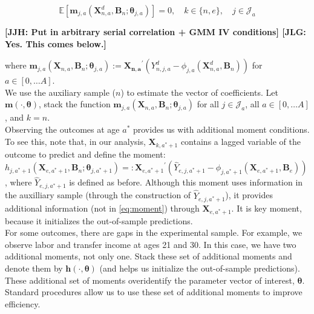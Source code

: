 \begin{equation}
\mathbb{E} \left[ \bm{m}_{j,a} \left( \bm{X}_{n,a}^d, \bm{B}_{n}; \bm{\theta}_{j,a} \right) \right] = 0,  \quad k \in \{n,e\}, \quad j \in \mathcal{J}_a \label{eq:moment}
\end{equation}

\noindent \textbf{[JJH: Put in arbitrary serial correlation + GMM IV conditions] [JLG: Yes. This comes below.]}

\noindent where $\bm{m}_{j,a} \left( \bm{X}_{n,a}, \bm{B}_{n} ; \bm{\theta}_{j,a} \right) := {\bm{X_{n,a}}}^{'} \left( Y_{n,j,a}^d -   \phi_{j,a} \left( \bm{X}_{n,a}^d, \bm{B}_{n} \right) \right)$ for $a \in [0, \ldots A]$.\\

\noindent We use the auxiliary sample ($n$) to estimate the vector of coefficients. Let $\bm{m} \left ( \cdot, \bm{\theta} \right)$, stack the function $\bm{m}_{j,a} \left( \bm{X}_{n,a}, \bm{B}_{n} ; \bm{\theta}_{j,a} \right)$  for all $j \in \mathcal{J}_a$, all $a \in [0, \ldots A]$, and $k = n$.\\

\noindent Observing the outcomes at age $a^*$ provides us with additional moment conditions. To see this, note that, in our analysis,  $\bm{X}_{k,a^*+1}$ contains a lagged variable of the outcome to predict and define the moment: $h_{j,a^*+1}  \left( \bm{X}_{e,a^*+1}, \bm{B}_{n} ; \bm{\theta}_{j,a^*+1} \right) =:  {\bm{X}_{e,a^*+1}}^{'} \left( \hat{Y}_{e,j,a^*+1} - \phi_{j,a^*+1} \left ( \bm{X}_{e,a^*+1}, \bm{B}_{e} \right) \right)$, where $\hat{Y}_{e,j,a^*+1}$ is defined as before. Although this moment uses information in the auxilliary sample (through the construction of $\hat{Y}_{e,j,a^*+1}$), it provides additional information (not in \eqref{eq:moment}) through $\bm{X}_{e,a^*+1}$. It is key moment, because it initializes the out-of-sample predictions.\\

\noindent For some outcomes, there are gaps in the experimental sample. For example, we observe labor and transfer income at ages 21 and 30. In this case, we have two additional moments, not only one. Stack these set of additional moments and denote them by $\bm{h} \left ( \cdot, \bm{\theta} \right)$ (and helps us initialize the out-of-sample predictions). These additional set of moments overidentify the parameter vector of interest, $\bm{\theta}$. Standard procedures allow us to use these set of additional moments to improve efficiency.\\

